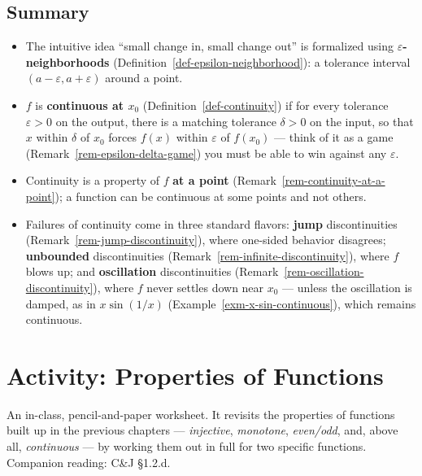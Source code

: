 \documentclass[
  letterpaper,
  DIV=11,
  numbers=noendperiod]{scrreprt}
\providecommand{\tightlist}{%
  \setlength{\itemsep}{0pt}\setlength{\parskip}{0pt}}
\theoremstyle{plain}
\theoremstyle{plain}
\theoremstyle{definition}
\theoremstyle{definition}
\theoremstyle{definition}
\theoremstyle{plain}
\theoremstyle{plain}
\theoremstyle{remark}
\begin{document}
\section{Summary}\label{summary-4}

\begin{itemize}
\tightlist
\item
  The intuitive idea ``small change in, small change out'' is formalized
  using \textbf{\(\varepsilon\)-neighborhoods}
  (Definition~\ref{def-epsilon-neighborhood}): a tolerance interval
  \((a-\varepsilon,a+\varepsilon)\) around a point.
\item
  \(f\) is \textbf{continuous at \(x_0\)}
  (Definition~\ref{def-continuity}) if for every tolerance
  \(\varepsilon>0\) on the output, there is a matching tolerance
  \(\delta>0\) on the input, so that \(x\) within \(\delta\) of \(x_0\)
  forces \(f(x)\) within \(\varepsilon\) of \(f(x_0)\) --- think of it
  as a game (Remark~\ref{rem-epsilon-delta-game}) you must be able to
  win against any \(\varepsilon\).
\item
  Continuity is a property of \(f\) \textbf{at a point}
  (Remark~\ref{rem-continuity-at-a-point}); a function can be continuous
  at some points and not others.
\item
  Failures of continuity come in three standard flavors: \textbf{jump}
  discontinuities (Remark~\ref{rem-jump-discontinuity}), where one-sided
  behavior disagrees; \textbf{unbounded} discontinuities
  (Remark~\ref{rem-infinite-discontinuity}), where \(f\) blows up; and
  \textbf{oscillation} discontinuities
  (Remark~\ref{rem-oscillation-discontinuity}), where \(f\) never
  settles down near \(x_0\) --- unless the oscillation is damped, as in
  \(x\sin(1/x)\) (Example~\ref{exm-x-sin-continuous}), which remains
  continuous.
\end{itemize}

\chapter{Activity: Properties of
Functions}\label{activity-properties-of-functions}

\begin{tcolorbox}[enhanced jigsaw, arc=.35mm, bottomrule=.15mm, bottomtitle=1mm, breakable, colback=white, colbacktitle=quarto-callout-note-color!10!white, colframe=quarto-callout-note-color-frame, coltitle=black, left=2mm, leftrule=.75mm, opacityback=0, opacitybacktitle=0.6, rightrule=.15mm, title={About this activity}, titlerule=0mm, toprule=.15mm, toptitle=1mm]

An in-class, pencil-and-paper worksheet. It revisits the properties of
functions built up in the previous chapters --- \emph{injective},
\emph{monotone}, \emph{even/odd}, and, above all, \emph{continuous} ---
by working them out in full for two specific functions. Companion
reading: C\&J §1.2.d.

\end{tcolorbox}
\end{document}
